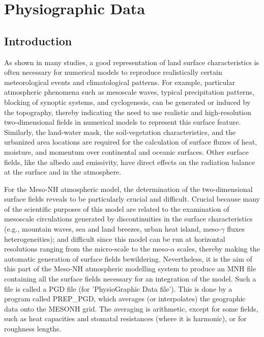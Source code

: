 %
\chapter{Physiographic Data\label{PGD}}
\minitoc


\section{Introduction}

As shown in many studies,
a good representation of land surface characteristics
is often necessary for numerical models to reproduce realistically certain
meteorological events and climatological patterns.
For example, particular atmospheric phenomena such as mesoscale waves, typical
precipitation patterns, blocking of synoptic systems, and cyclogenesis, can
be generated or induced by the topography, thereby indicating the need to use
realistic and high-resolution two-dimensional fields in numerical models to
represent this surface feature.
Similarly, the land-water mask, the soil-vegetation characteristics, and
the urbanized area locations are
required for the calculation of surface fluxes of heat, moisture, and
momentum over continental and oceanic surfaces.
Other surface fields, like the albedo and emissivity, have direct effects
on the radiation balance at the surface and in the atmosphere.


For the Meso-NH atmospheric model, the determination of the two-dimensional
surface fields reveals to be particularly crucial and difficult.
Crucial because many of the scientific purposes of this model are related
to the examination of mesoscale circulations generated by discontinuities
in the surface characteristics (e.g., mountain waves, sea and land breezes,
urban heat island, meso-$\gamma$ fluxes heterogeneities);
and difficult since this model can be run at horizontal resolutions ranging
from the micro-scale to the meso-$\alpha$ scales, thereby making the
automatic generation of surface fields bewildering.
Nevertheless, it is the aim of this part of the Meso-NH atmospheric modelling
system to produce an MNH file containing all the surface fields
necessary for an integration of the model. Such a file is called a
PGD file (for 'PhysioGraphic Data file'). This is done by a program
called PREP\_PGD, which averages
(or interpolates) the geographic data onto the MESONH grid.
The averaging is arithmetic, except for some fields, such as heat capacities
and stomatal resistances (where it is harmonic), or for roughness lengths.\\

